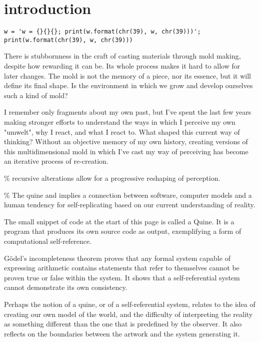 \chapter*{introduction}
\begin{center}
\vspace{2cm}
\begin{flushright}
\footnotesize 
\begin{verbatim}
w = 'w = {}{}{}; print(w.format(chr(39), w, chr(39)))'; 
print(w.format(chr(39), w, chr(39)))
\end{verbatim} 
\end{flushright}
\vspace{2cm}
\end{center}
\normalsize

There is stubbornness in the craft of casting materials through mold making, despite how rewarding it can be. Its whole process makes it hard to allow for later changes. The mold is not the memory of a piece, nor its essence, but it will define its final shape. Is the environment in which we grow and develop ourselves such a kind of mold? 

I remember only fragments about my own past, but I’ve spent the last few years making stronger efforts to understand the ways in which I perceive my own "umwelt", why I react, and what I react to.  What shaped this current way of thinking? Without an objective memory of my own history, creating versions of this multidimensional mold in which I’ve cast my way of perceiving has become an iterative process of re-creation.


{\scriptsize \textcolor{comment}{\% recursive alterations allow for a progressive reshaping of perception. }}

{\scriptsize \textcolor{comment}{\% The quine and implies a connection between software, computer models and a human tendency for self-replicating based on our current understanding of reality.}}

The small snippet of code at the start of this page is called a Quine. It is a program that produces its own source code as output, exemplifying a form of computational self-reference. 

Gödel’s incompleteness theorem proves that any formal system capable of expressing arithmetic contains statements that refer to themselves cannot be proven true or false within the system. It shows that a self-referential system cannot demonstrate its own consistency.

Perhaps the notion of a quine, or of a self-referential system, relates to the idea of creating our own model of the world, and the difficulty of interpreting the reality as something different than the one that is predefined by the observer. It also reflects on the boundaries between the artwork and the system generating it.

